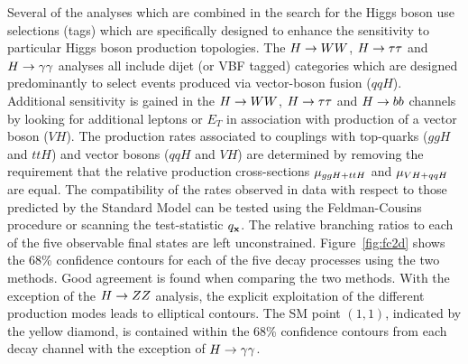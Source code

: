 Several of the analyses which are combined in the search for the Higgs boson use  
selections (tags) which are specifically designed 
to enhance the sensitivity to particular Higgs boson 
production topologies. The $H\rightarrow WW$, $H\rightarrow\tau\tau$ and $H\rightarrow\gamma\gamma$ analyses all include
dijet (or VBF tagged) categories which are designed predominantly to select events 
produced via vector-boson fusion ($qqH$). 
Additional sensitivity is gained in the $H\rightarrow WW$, $H\rightarrow\tau\tau$ and $H\rightarrow bb$ channels by 
looking for additional leptons or $E_{T}$ in association with production of 
a vector boson ($VH$). The production rates associated 
to couplings with top-quarks ($ggH$ and $ttH$) and vector bosons ($qqH$ and $VH$) 
are determined by removing the requirement that the relative production 
cross-sections $\mu_{ggH+ttH}$ and $\mu_{VH+qqH}$ are equal.
The compatibility of the rates observed in data with respect to those
predicted by the Standard Model can be tested using the Feldman-Cousins
procedure or scanning the test-statistic $q_{{\mathbf{x}}}$. The relative branching ratios to each of the five observable final states
are left unconstrained.
Figure~\ref{fig:fc2d} shows the 68\% confidence contours for each
of the five decay processes using the two methods. Good agreement is found when comparing the two methods. 
With the exception of the $H\rightarrow ZZ$ analysis, the
explicit exploitation of the different production modes leads to 
elliptical contours. The SM point $(1,1)$, indicated by the yellow diamond, 
is contained within the 68\% confidence contours from each decay channel with the 
exception of $H\rightarrow\gamma\gamma$.  

